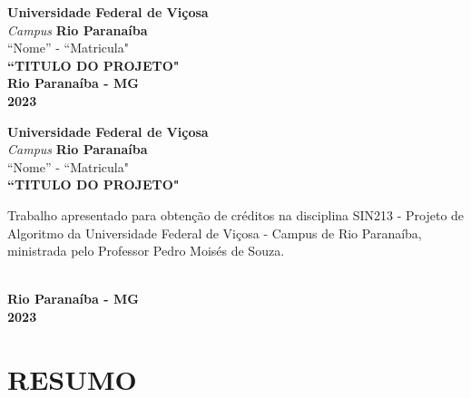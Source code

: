\documentclass[12pt,arial]{article}
\author{[Seu Nome]}
\begin{document}
	\begin{titlepage}
		\begin{center}
			\textbf{Universidade Federal de Viçosa}
			\textit{\\Campus}
			\textbf{Rio Paranaíba}
			\textnormal{\\\vspace{4cm}``Nome'' - ``Matricula"}
			\textbf{\\\vspace{5cm}``TITULO DO PROJETO"}
			\textbf{\\\vspace{9cm}Rio Paranaíba - MG \\ 2023}
		\end{center}
	\end{titlepage}
	
		\begin{titlepage}
			\begin{center}
				\textbf{Universidade Federal de Viçosa}
				\textit{\\Campus}
				\textbf{Rio Paranaíba}
				\textnormal{\\\vspace{3cm}``Nome'' - ``Matricula"}
				\textbf{\\\vspace{4cm}``TITULO DO PROJETO"\vspace{3cm}}
					\begin{flushright}
						\begin{minipage}{.5\textwidth}
							\textnormal{Trabalho apresentado para obtenção de créditos na disciplina SIN213 - Projeto de Algoritmo da Universidade Federal de Viçosa - Campus de Rio Paranaíba, ministrada pelo Professor Pedro Moisés de Souza.}
						\end{minipage}
					\end{flushright}
					
				\textbf{\\\vspace{3cm}Rio Paranaíba - MG \\ 2023}
				
			\end{center}
		\end{titlepage}
		
		
		\section{RESUMO}
		
		\newpage

		\tableofcontents
		\newpage
  
\end{document}

